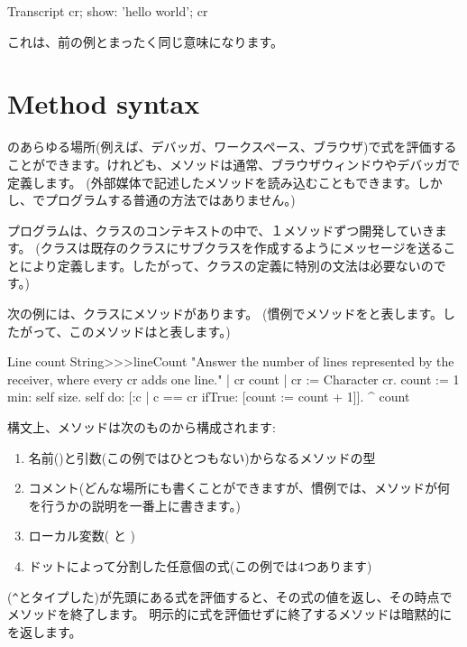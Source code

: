 \documentclass[a4paper,10pt,twoside]{book}
\begin{document}
\begin{code}{}
Transcript cr;
    show: 'hello world';
    cr
\end{code}
これは、前の例とまったく同じ意味になります。

\section{Method syntax}

\pharo のあらゆる場所(例えば、デバッガ、ワークスペース、ブラウザ)で式を評価することができます。けれども、メソッドは通常、ブラウザウィンドウやデバッガで定義します。
(外部媒体で記述したメソッドを読み込むこともできます。しかし、\pharo でプログラムする普通の方法ではありません。)

プログラムは、クラスのコンテキストの中で、１メソッドずつ開発していきます。
(クラスは既存のクラスにサブクラスを作成するようにメッセージを送ることにより定義します。したがって、クラスの定義に特別の文法は必要ないのです。)

次の例には、クラスにメソッドがあります。
(慣例でメソッドをと表します。したがって、このメソッドはと表します。)

\begin{method}[lineCount]{Line count}
String>>>lineCount
   "Answer the number of lines represented by the receiver,
   where every cr adds one line."
   | cr count |
   cr := Character cr.
   count := 1 min: self size.
   self do:
      [:c | c == cr ifTrue: [count := count + 1]].
   ^ count
\end{method}

構文上、メソッドは次のものから構成されます:
\begin{enumerate}
  \item 名前(\ie {})と引数(この例ではひとつもない)からなるメソッドの型
  \item コメント(どんな場所にも書くことができますが、慣例では、メソッドが何を行うかの説明を一番上に書きます。)
  \item ローカル変数(\ie {} と )
  \item ドットによって分割した任意個の式(この例では4つあります)
\end{enumerate}

\ct{^}(\verb|^|とタイプした)が先頭にある式を評価すると、その式の値を返し、その時点でメソッドを終了します。
明示的に式を評価せずに終了するメソッドは暗黙的にを返します。
\end{document}
